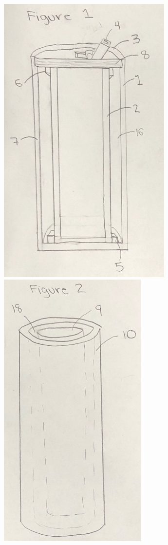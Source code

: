 \documentclass[english]{uspatent}
\begin{document}
\begin{center}
\includegraphics{Figure1.png}\\
\includegraphics{Figure2.png}\\

\end{center}
\end{document}
